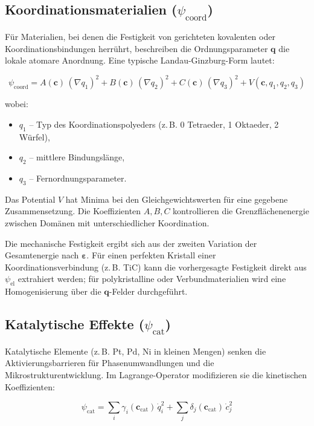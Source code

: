 \documentclass[12pt,a4paper]{article}
\begin{document}
\subsection{Koordinationsmaterialien (\(\psi_{\mathrm{coord}}\))}
\label{subsec:coordination}

Für Materialien, bei denen die Festigkeit von gerichteten kovalenten oder Koordinationsbindungen herrührt, beschreiben die Ordnungsparameter \(\mathbf{q}\) die lokale atomare Anordnung. Eine typische Landau-Ginzburg-Form lautet:

\[
\psi_{\mathrm{coord}} = A(\mathbf{c})\,(\nabla q_1)^2 + B(\mathbf{c})\,(\nabla q_2)^2 + C(\mathbf{c})\,(\nabla q_3)^2 + V(\mathbf{c}, q_1, q_2, q_3)
\]

wobei:
\begin{itemize}
\item \(q_1\) – Typ des Koordinationspolyeders (z. B. 0 Tetraeder, 1 Oktaeder, 2 Würfel),
\item \(q_2\) – mittlere Bindungslänge,
\item \(q_3\) – Fernordnungsparameter.
\end{itemize}

Das Potential \(V\) hat Minima bei den Gleichgewichtswerten für eine gegebene Zusammensetzung. Die Koeffizienten \(A,B,C\) kontrollieren die Grenzflächenenergie zwischen Domänen mit unterschiedlicher Koordination.

Die mechanische Festigkeit ergibt sich aus der zweiten Variation der Gesamtenergie nach \(\boldsymbol{\varepsilon}\). Für einen perfekten Kristall einer Koordinationsverbindung (z. B. TiC) kann die vorhergesagte Festigkeit direkt aus \(\psi_{\mathrm{el}}\) extrahiert werden; für polykristalline oder Verbundmaterialien wird eine Homogenisierung über die \(\mathbf{q}\)-Felder durchgeführt.

\subsection{Katalytische Effekte (\(\psi_{\mathrm{cat}}\))}
\label{subsec:catalysis}

Katalytische Elemente (z. B. Pt, Pd, Ni in kleinen Mengen) senken die Aktivierungsbarrieren für Phasenumwandlungen und die Mikrostrukturentwicklung. Im Lagrange-Operator modifizieren sie die kinetischen Koeffizienten:

\[
\psi_{\mathrm{cat}} = \sum_i \gamma_i(\mathbf{c}_{\mathrm{cat}})\, \dot{q}_i^2 + \sum_j \delta_j(\mathbf{c}_{\mathrm{cat}})\, \dot{c}_j^2
\]
\end{document}

